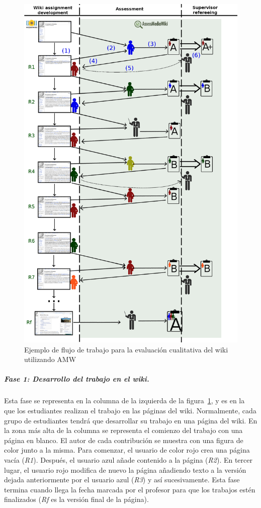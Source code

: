 \begin{figure}
  \begin{center}
    \includegraphics[scale=0.28]{AmwDiagram.png}
  \end{center}
  \caption{Ejemplo de flujo de trabajo para la evaluación cualitativa del wiki utilizando AMW}
  \label{fig:AmwDiagram}
\end{figure}

			\subparagraph*{Fase 1: Desarrollo del trabajo en el wiki.}

			Esta fase se representa en la columna de la izquierda de la figura~\ref{fig:AmwDiagram}, y es en la que los estudiantes realizan el trabajo en las páginas del wiki. Normalmente, cada grupo de estudiantes tendrá que desarrollar su trabajo en una página del wiki. En la zona más alta de la columna se representa el comienzo del trabajo con una página en blanco. El autor de cada contribución se muestra con una figura de color junto a la misma. Para comenzar, el usuario de color rojo crea una página vacía (\emph{R1}). Después, el usuario azul añade contenido a la página (\emph{R2}). En tercer lugar, el usuario rojo modifica de nuevo la página añadiendo texto a la versión dejada anteriormente por el usuario azul (\emph{R3}) y así sucesivamente. Esta fase termina cuando llega la fecha marcada por el profesor para que los trabajos estén finalizados (\emph{Rf} es la versión final de la página).

